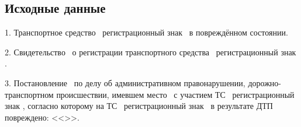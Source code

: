 
\setcounter{page}{1}


%
%

%
%	
	                                                       
 \subsection{Исходные данные}

1. Транспортное средство \tc\, регистрационный знак \,  в повреждённом состоянии.

2. Свидетельство \, о регистрации  транспортного средства  \, регистрационный знак .

3. Постановление \, по делу об административном правонарушении, дорожно-транспортном происшествии, имевшем место  \, с участием  ТС \, регистрационный знак , согласно которому на ТС \, регистрационный знак \,  в результате ДТП повреждено:  << >>.  
 

